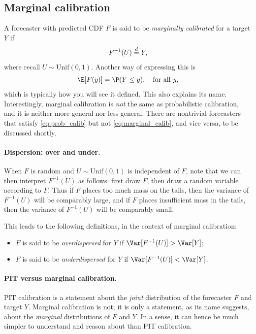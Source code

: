 \documentclass{article}
\begin{document}
\subsection{Marginal calibration}

A forecaster with predicted CDF $F$ is said to be \emph{marginally calibrated}
for a target $Y$ if  
\begin{equation}
\label{eq:marginal_calib}
F^{-1}(U) \overset{d}{=} Y,
\end{equation}
where recall $U \sim \mathrm{Unif}(0,1)$. Another way of expressing this is  
\[
\E[F(y)] = \P(Y \leq y), \quad \text{for all $y$},
\]
which is typically how you will see it defined. This also explains its name. 
Interestingly, marginal calibration is \emph{not} the same as probabilistic
calibration, and it is neither more general nor less general. There are
nontrivial forecasters that satisfy \eqref{eq:prob_calib} but not
\eqref{eq:marginal_calib}, and vice versa, to be discussed shortly.  

\paragraph{Dispersion: over and under.}

When $F$ is random and $U \sim \mathrm{Unif}(0,1)$ is independent of $F$, note
that we can then interpret $F^{-1}(U)$ as follows: first draw $F$, then draw a
random variable according to $F$. Thus if $F$ places too much mass on the tails,
then the variance of $F^{-1}(U)$ will be comparably large, and if $F$ places 
insufficient mass in the tails, then the variance of $F^{-1}(U)$ will be
comparably small. 

This leads to the following definitions, in the context of marginal calibration:      

\begin{itemize}
\item $F$ is said to be \emph{overdispersed} for $Y$ if $\Var[F^{-1}(U)] > \Var[Y]$;
\item $F$ is said to be \emph{underdispersed} for $Y$ if $\Var[F^{-1}(U)] < \Var[Y]$.
\end{itemize}

\paragraph{PIT versus marginal calibration.}

PIT calibration is a statement about the \emph{joint} distribution of the
forecaster $F$ and target $Y$. Marginal calibration is not; it is only a
statement, as its name suggests, about the \emph{marginal} distributions of $F$
and $Y$. In a sense, it can hence be much simpler to understand and reason about 
than PIT calibration.
\end{document}
